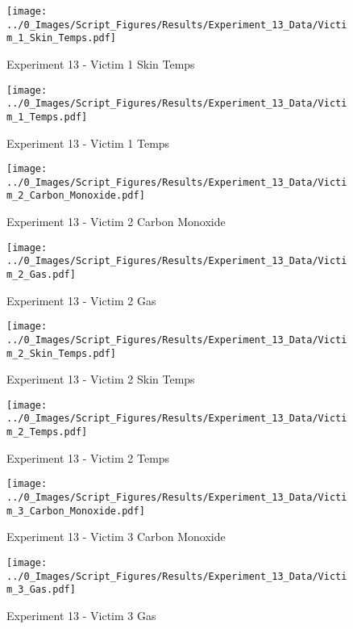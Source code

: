 	\clearpage

	\begin{figure}[H]
		\centering
		\texttt{[image: ../0\_Images/Script\_Figures/Results/Experiment\_13\_Data/Victim\_1\_Skin\_Temps.pdf]}
		\caption[]{Experiment 13 - Victim 1 Skin Temps}
	\end{figure}
 

	\begin{figure}[H]
		\centering
		\texttt{[image: ../0\_Images/Script\_Figures/Results/Experiment\_13\_Data/Victim\_1\_Temps.pdf]}
		\caption[]{Experiment 13 - Victim 1 Temps}
	\end{figure}
 
	\clearpage

	\begin{figure}[H]
		\centering
		\texttt{[image: ../0\_Images/Script\_Figures/Results/Experiment\_13\_Data/Victim\_2\_Carbon\_Monoxide.pdf]}
		\caption[]{Experiment 13 - Victim 2 Carbon Monoxide}
	\end{figure}
 

	\begin{figure}[H]
		\centering
		\texttt{[image: ../0\_Images/Script\_Figures/Results/Experiment\_13\_Data/Victim\_2\_Gas.pdf]}
		\caption[]{Experiment 13 - Victim 2 Gas}
	\end{figure}
 
	\clearpage

	\begin{figure}[H]
		\centering
		\texttt{[image: ../0\_Images/Script\_Figures/Results/Experiment\_13\_Data/Victim\_2\_Skin\_Temps.pdf]}
		\caption[]{Experiment 13 - Victim 2 Skin Temps}
	\end{figure}
 

	\begin{figure}[H]
		\centering
		\texttt{[image: ../0\_Images/Script\_Figures/Results/Experiment\_13\_Data/Victim\_2\_Temps.pdf]}
		\caption[]{Experiment 13 - Victim 2 Temps}
	\end{figure}
 
	\clearpage

	\begin{figure}[H]
		\centering
		\texttt{[image: ../0\_Images/Script\_Figures/Results/Experiment\_13\_Data/Victim\_3\_Carbon\_Monoxide.pdf]}
		\caption[]{Experiment 13 - Victim 3 Carbon Monoxide}
	\end{figure}
 

	\begin{figure}[H]
		\centering
		\texttt{[image: ../0\_Images/Script\_Figures/Results/Experiment\_13\_Data/Victim\_3\_Gas.pdf]}
		\caption[]{Experiment 13 - Victim 3 Gas}
	\end{figure}
 
